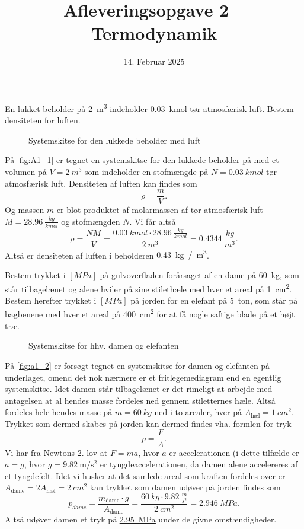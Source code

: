 \documentclass[a4paper]{article}
\title{Afleveringsopgave 2 – Termodynamik}
\date{14. Februar 2025}
\begin{document}
\maketitle

En lukket beholder på \qty{2}{m^3} indeholder \qty{0,03}{kmol} tør atmosfærisk luft. Bestem densiteten for luften.

\begin{figure}[ht]
  \centering
  \caption{Systemskitse for den lukkede beholder med luft}
  \label{fig:A1_1}
\end{figure}

På \autoref{fig:A1_1} er tegnet en systemskitse for den lukkede beholder på med et volumen på $V = \qty{2}{m^3}$ som indeholder en stofmængde på $N = \qty{0,03}{kmol}$ tør atmosfærisk luft. Densiteten af luften kan findes som
\[ 
\rho = \frac{m}{V}
.\]
Og massen $m$ er blot produktet af molarmassen af tør atmosfærisk luft $M = \qty{28,96}{\frac{kg}{kmol}}$ og stofmængden $N$. Vi får altså
\[ 
\rho = \frac{NM}{V} = \frac{\qty{0,03}{kmol} \cdot \qty{28,96}{\frac{kg}{kmol}}}{\qty{2}{m^3}} = \qty{0,4344}{\frac{kg}{m^3}} 
.\]
Altså er densiteten af luften i beholderen \underline{\underline{\qty{0,43}{kg / m^3}}}.


\clearpage

Bestem trykket i $[\unit{MPa}]$ på gulvoverfladen forårsaget af en dame på \qty{60}{kg}, som står tilbagelænet og alene hviler på sine stilethæle med hver et areal på \qty{1}{cm^2}. Bestem herefter trykket i $[\unit{MPa}]$ på jorden for en elefant på \qty{5}{ton}, som står på bagbenene med hver et areal på \qty{400}{cm^2} for at få nogle saftige blade på et højt træ.

\begin{figure}[ht]
    \centering
    \caption{Systemskitse for hhv. damen og elefanten}
    \label{fig:a1_2}
\end{figure}

På \autoref{fig:a1_2} er forsøgt tegnet en systemskitse for damen og elefanten på underlaget, omend det nok nærmere er et fritlegemediagram end en egentlig systemskitse. Idet damen står tilbagelænet er det rimeligt at arbejde med antagelsen at al hendes masse fordeles ned gennem stiletternes hæle. Altså fordeles hele hendes masse på $m = \qty{60}{kg}$ ned i to arealer, hver på $A_{\text{hæl}} = \qty{1}{cm^2}$. Trykket som dermed skabes på jorden kan dermed findes vha. formlen for tryk
\[ 
p = \frac{F}{A}
.\]
Vi har fra Newtons 2. lov at $F = ma$, hvor $a$ er accelerationen (i dette tilfælde er $a = g$, hvor $g = \qty{9,82}{\meter\per\square\second}$ er tyngdeaccelerationen, da damen alene accelereres af et tyngdefelt. Idet vi husker at det samlede areal som kraften fordeles over er $A_{\mathrm{dame}} = 2A_{\text{hæl}} = \qty{2}{cm^2}$ kan trykket som damen udøver på jorden findes som
\[ 
  p_{dame} = \frac{m_{\mathrm{dame}} \cdot g}{A_{\mathrm{dame}}} = \frac{\qty{60}{kg} \cdot \qty{9,82}{\frac{m}{s^2}}}{\qty{2}{cm^2}} = \qty{2,946}{MPa}
.\]
Altså udøver damen et tryk på \underline{\underline{\qty{2,95}{MPa}}} under de givne omstændigheder.
\end{document}
